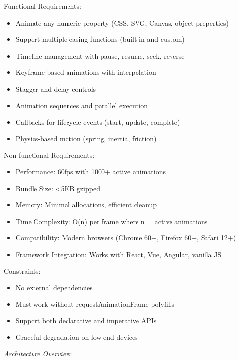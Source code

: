 \documentclass[11pt]{article}
\begin{document}
Functional Requirements:

\begin{itemize}
\item Animate any numeric property (CSS, SVG, Canvas, object properties)
\item Support multiple easing functions (built-in and custom)
\item Timeline management with pause, resume, seek, reverse
\item Keyframe-based animations with interpolation
\item Stagger and delay controls
\item Animation sequences and parallel execution
\item Callbacks for lifecycle events (start, update, complete)
\item Physics-based motion (spring, inertia, friction)
\end{itemize}

Non-functional Requirements:

\begin{itemize}
\item Performance: 60fps with 1000+ active animations
\item Bundle Size: <5KB gzipped
\item Memory: Minimal allocations, efficient cleanup
\item Time Complexity: O(n) per frame where n = active animations
\item Compatibility: Modern browsers (Chrome 60+, Firefox 60+, Safari 12+)
\item Framework Integration: Works with React, Vue, Angular, vanilla JS
\end{itemize}

Constraints:

\begin{itemize}
\item No external dependencies
\item Must work without requestAnimationFrame polyfills
\item Support both declarative and imperative APIs
\item Graceful degradation on low-end devices
\end{itemize}

\emph{Architecture Overview}:
\end{document}
